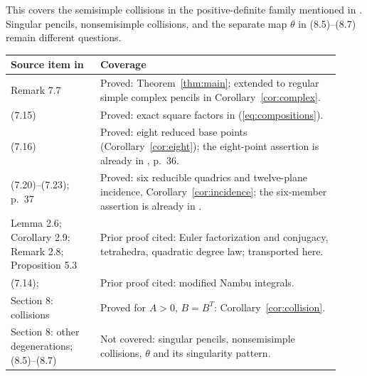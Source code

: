 \documentclass[11pt]{article}
\begin{document}
This covers the semisimple collisions in the positive-definite family
mentioned in \cite[Section~8]{GG}. Singular pencils, nonsemisimple
collisions, and the separate map $\theta$ in (8.5)--(8.7) remain different
questions.

\begin{center}\small
\begin{tabular}{@{}p{0.25\linewidth}p{0.67\linewidth}@{}}
\toprule
Source item in \cite{GG} & Coverage\\\midrule
Remark 7.7 & Proved: Theorem~\ref{thm:main}; extended to regular simple complex pencils in Corollary~\ref{cor:complex}.\\
(7.15) & Proved: exact square factors in (\ref{eq:compositions}).\\
(7.16) & Proved: eight reduced base points (Corollary~\ref{cor:eight}); the eight-point assertion is already in \cite{GG}, p.\ 36.\\
(7.20)--(7.23); p.\ 37 & Proved: six reducible quadrics and twelve-plane incidence, Corollary~\ref{cor:incidence}; the six-member assertion is already in \cite{GG}.\\
Lemma 2.6; Corollary 2.9; Remark 2.8; Proposition 5.3 & Prior proof cited: Euler factorization and conjugacy, tetrahedra, quadratic degree law; transported here.\\
(7.14); \cite[Prop.\ 5]{Celledoni} & Prior proof cited: modified Nambu integrals.\\
Section 8: collisions & Proved for $A>0$, $B=B^T$: Corollary~\ref{cor:collision}.\\
Section 8: other degenerations; (8.5)--(8.7) & Not covered: singular pencils, nonsemisimple collisions, $\theta$ and its singularity pattern.\\
\bottomrule
\end{tabular}
\end{center}
\end{document}
